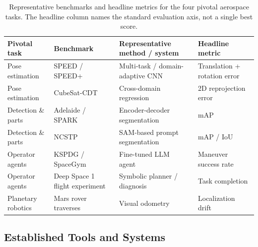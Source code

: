 \begin{table}[!ht]
\centering
\caption{Representative benchmarks and headline metrics for the four pivotal aerospace tasks. The headline column names the standard evaluation axis, not a single best score.}
\label{tab:p4_s11_3_benchmarks}
\fontsize{8}{10}\selectfont
\setlength{\tabcolsep}{1.0mm}
\begin{tabular}{L{0.18\textwidth} L{0.24\textwidth} L{0.30\textwidth} L{0.20\textwidth}}
\toprule
\textbf{Pivotal task} & \textbf{Benchmark} & \textbf{Representative method / system} & \textbf{Headline metric} \\
\midrule
Pose estimation & SPEED / SPEED+~\cite{Sharma2019SpacecraftPE,park2022speed+} & Multi-task / domain-adaptive CNN~\cite{park2024robustspacecraftposeestimation} & Translation + rotation error \\
Pose estimation & CubeSat-CDT~\cite{musallam2022cubesatcdt} & Cross-domain regression~\cite{garcia2021lspnet} & 2D reprojection error \\
Detection \& parts & Adelaide / SPARK~\cite{dung2021spacecraftdataset,musallam2021spacecraft} & Encoder-decoder segmentation~\cite{zhao20223dnoncooperativespacecraft} & mAP \\
Detection \& parts & NCSTP~\cite{liu2025largencstp} & SAM-based prompt segmentation~\cite{zhang2024automaticspacetarget} & mAP / IoU \\
Operator agents & KSPDG / SpaceGym~\cite{allen2023spacegym} & Fine-tuned LLM agent~\cite{carrasco2025llmAutonomousSpacecraft} & Maneuver success rate \\
Operator agents & Deep Space 1 flight experiment~\cite{bernard1998designremoteagent} & Symbolic planner / diagnosis~\cite{pell1997autonomousspacecraftagent} & Task completion \\
Planetary robotics & Mars rover traverses~\cite{toupet2025enav} & Visual odometry~\cite{maimone2007two} & Localization drift \\
\bottomrule
\end{tabular}
\end{table}


\subsection{Established Tools and Systems}
\label{subsec:p4-sec11-3-established-tools-and-systems}

